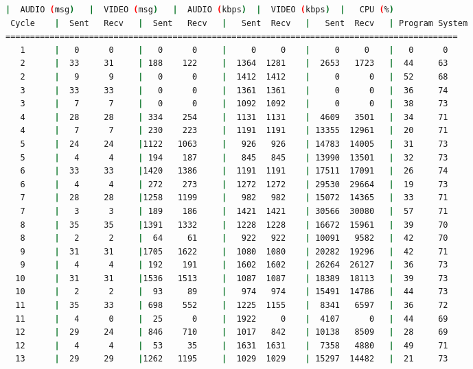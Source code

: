 \begin{adjustbox}{max width=\textwidth}
\begin{lstlisting}[language=bash,basicstyle=\ttfamily\scriptsize]
          |  AUDIO (msg)   |  VIDEO (msg)   |  AUDIO (kbps)  |  VIDEO (kbps)  |   CPU (%)
 Cycle    |  Sent   Recv   |  Sent   Recv   |   Sent  Recv   |   Sent  Recv   | Program System
============================================================================================
   1      |   0      0     |   0      0     |     0     0    |     0     0    |   0      0
   2      |  33     31     | 188    122     |  1364  1281    |  2653   1723   |  44     63
   2      |   9      9     |   0      0     |  1412  1412    |     0      0   |  52     68
   3      |  33     33     |   0      0     |  1361  1361    |     0      0   |  36     74
   3      |   7      7     |   0      0     |  1092  1092    |     0      0   |  38     73
   4      |  28     28     | 334    254     |  1131  1131    |  4609   3501   |  34     71
   4      |   7      7     | 230    223     |  1191  1191    | 13355  12961   |  20     71
   5      |  24     24     |1122   1063     |   926   926    | 14783  14005   |  31     73
   5      |   4      4     | 194    187     |   845   845    | 13990  13501   |  32     73
   6      |  33     33     |1420   1386     |  1191  1191    | 17511  17091   |  26     74
   6      |   4      4     | 272    273     |  1272  1272    | 29530  29664   |  19     73
   7      |  28     28     |1258   1199     |   982   982    | 15072  14365   |  33     71
   7      |   3      3     | 189    186     |  1421  1421    | 30566  30080   |  57     71
   8      |  35     35     |1391   1332     |  1228  1228    | 16672  15961   |  39     70
   8      |   2      2     |  64     61     |   922   922    | 10091   9582   |  42     70
   9      |  31     31     |1705   1622     |  1080  1080    | 20282  19296   |  42     71
   9      |   4      4     | 192    191     |  1602  1602    | 26264  26127   |  36     73
  10      |  31     31     |1536   1513     |  1087  1087    | 18389  18113   |  39     73
  10      |   2      2     |  93     89     |   974   974    | 15491  14786   |  44     73
  11      |  35     33     | 698    552     |  1225  1155    |  8341   6597   |  36     72
  11      |   4      0     |  25      0     |  1922     0    |  4107      0   |  44     69
  12      |  29     24     | 846    710     |  1017   842    | 10138   8509   |  28     69
  12      |   4      4     |  53     35     |  1631  1631    |  7358   4880   |  49     71
  13      |  29     29     |1262   1195     |  1029  1029    | 15297  14482   |  21     73

\end{lstlisting}
\end{adjustbox}

